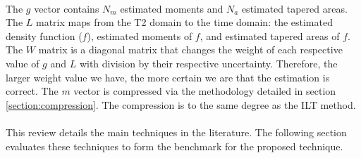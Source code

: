 \paragraph{}
    The $g$ vector contains $N_{m}$ estimated moments and $N_{a}$ estimated tapered areas. The $L$ matrix maps from the T2 domain to the time domain: the estimated density function ($f$), estimated moments of $f$, and estimated tapered areas of $f$. The $W$ matrix is a diagonal matrix that changes the weight of each respective value of $g$ and $L$ with division by their respective uncertainty. Therefore, the larger weight value we have, the more certain we are that the estimation is correct. The $m$ vector is compressed via the methodology detailed in section \ref{section:compression}. The compression is to the same degree as the ILT method. 

\paragraph{}
This review details the main techniques in the literature. The following section evaluates these techniques to form the benchmark for the proposed technique.





